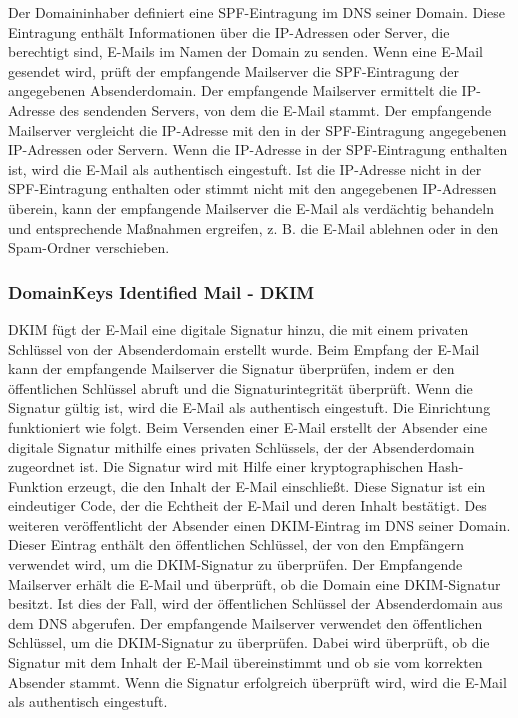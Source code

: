\documentclass[journal=tosc,final]{iacrtrans}
\begin{document}
 Der Domaininhaber definiert eine SPF-Eintragung im DNS seiner Domain. Diese Eintragung enthält Informationen über die IP-Adressen oder Server, die berechtigt sind, E-Mails im Namen der Domain zu senden. Wenn eine E-Mail gesendet wird, prüft der empfangende Mailserver die SPF-Eintragung der angegebenen Absenderdomain. Der empfangende Mailserver ermittelt die IP-Adresse des sendenden Servers, von dem die E-Mail stammt. Der empfangende Mailserver vergleicht die IP-Adresse mit den in der SPF-Eintragung angegebenen IP-Adressen oder Servern. Wenn die IP-Adresse in der SPF-Eintragung enthalten ist, wird die E-Mail als authentisch eingestuft. Ist die IP-Adresse nicht in der SPF-Eintragung enthalten oder stimmt nicht mit den angegebenen IP-Adressen überein, kann der empfangende Mailserver die E-Mail als verdächtig behandeln und entsprechende Maßnahmen ergreifen, z. B. die E-Mail ablehnen oder in den Spam-Ordner verschieben.
 \subsubsection{DomainKeys Identified Mail - DKIM}
 DKIM fügt der E-Mail eine digitale Signatur hinzu, die mit einem privaten Schlüssel von der Absenderdomain erstellt wurde. Beim Empfang der E-Mail kann der empfangende Mailserver die Signatur überprüfen, indem er den öffentlichen Schlüssel abruft und die Signaturintegrität überprüft. Wenn die Signatur gültig ist, wird die E-Mail als authentisch eingestuft. Die Einrichtung funktioniert wie folgt. Beim Versenden einer E-Mail erstellt der Absender eine digitale Signatur mithilfe eines privaten Schlüssels, der der Absenderdomain zugeordnet ist. Die Signatur wird mit Hilfe einer kryptographischen Hash-Funktion erzeugt, die den Inhalt der E-Mail einschließt. Diese Signatur ist ein eindeutiger Code, der die Echtheit der E-Mail und deren Inhalt bestätigt. Des weiteren veröffentlicht der Absender einen DKIM-Eintrag im DNS seiner Domain. Dieser Eintrag enthält den öffentlichen Schlüssel, der von den Empfängern verwendet wird, um die DKIM-Signatur zu überprüfen. Der Empfangende Mailserver erhält die E-Mail und überprüft, ob die Domain eine DKIM-Signatur besitzt. Ist dies der Fall,  wird der öffentlichen Schlüssel der Absenderdomain aus dem DNS abgerufen. Der empfangende Mailserver verwendet den öffentlichen Schlüssel, um die DKIM-Signatur zu überprüfen. Dabei wird überprüft, ob die Signatur mit dem Inhalt der E-Mail übereinstimmt und ob sie vom korrekten Absender stammt. Wenn die Signatur erfolgreich überprüft wird, wird die E-Mail als authentisch eingestuft.
\end{document}
